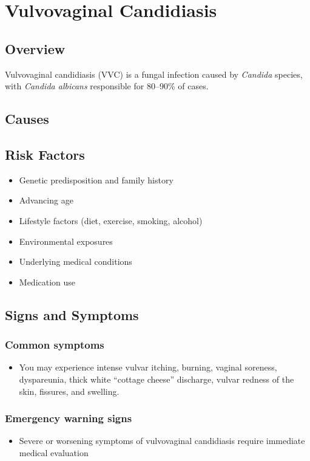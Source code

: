 \chapter{Vulvovaginal Candidiasis}
\label{sec:Vulvovaginal Candidiasis}

\section{Overview}
Vulvovaginal candidiasis (VVC) is a fungal infection caused by \textit{Candida} species, with \textit{Candida albicans} responsible for 80--90\% of cases.
\section{Causes}
\section{Risk Factors}

\begin{itemize}[noitemsep]
  \item Genetic predisposition and family history
  \item Advancing age
  \item Lifestyle factors (diet, exercise, smoking, alcohol)
  \item Environmental exposures
  \item Underlying medical conditions
  \item Medication use
\end{itemize}
\section{Signs and Symptoms}

\subsection{Common symptoms}
\begin{itemize}[noitemsep]
  \item You may experience intense vulvar itching, burning, vaginal soreness, dyspareunia, thick white ``cottage cheese'' discharge, vulvar redness of the skin, fissures, and swelling. 
  \end{itemize}

\subsection{Emergency warning signs}
\begin{itemize}[noitemsep]
  \item Severe or worsening symptoms of vulvovaginal candidiasis require immediate medical evaluation
\end{itemize}
